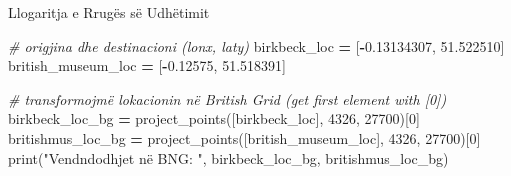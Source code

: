 \documentclass[
  ignorenonframetext,
]{beamer}
\newenvironment{Shaded}{\begin{snugshade}}{\end{snugshade}}
\newcommand{\BuiltInTok}[1]{#1}
\newcommand{\CommentTok}[1]{\textcolor[rgb]{0.56,0.35,0.01}{\textit{#1}}}
\newcommand{\DecValTok}[1]{\textcolor[rgb]{0.00,0.00,0.81}{#1}}
\newcommand{\FloatTok}[1]{\textcolor[rgb]{0.00,0.00,0.81}{#1}}
\newcommand{\NormalTok}[1]{#1}
\newcommand{\OperatorTok}[1]{\textcolor[rgb]{0.81,0.36,0.00}{\textbf{#1}}}
\newcommand{\StringTok}[1]{\textcolor[rgb]{0.31,0.60,0.02}{#1}}
\begin{document}
\begin{frame}[fragile]{Llogaritja e Rrugës së Udhëtimit}
\protect\hypertarget{llogaritja-e-rruguxebs-suxeb-udhuxebtimit}{}

\begin{Shaded}
\begin{Highlighting}[]
\CommentTok{\# origjina dhe destinacioni (lonx, laty)}
\NormalTok{birkbeck\_loc }\OperatorTok{=}\NormalTok{ [}\OperatorTok{{-}}\FloatTok{0.13134307}\NormalTok{, }\FloatTok{51.522510}\NormalTok{]}
\NormalTok{british\_museum\_loc }\OperatorTok{=}\NormalTok{ [}\OperatorTok{{-}}\FloatTok{0.12575}\NormalTok{, }\FloatTok{51.518391}\NormalTok{]}

\CommentTok{\# transformojmë lokacionin në British Grid (get first element with [0])}
\NormalTok{birkbeck\_loc\_bg }\OperatorTok{=}\NormalTok{ project\_points([birkbeck\_loc], }\DecValTok{4326}\NormalTok{, }\DecValTok{27700}\NormalTok{)[}\DecValTok{0}\NormalTok{]}
\NormalTok{britishmus\_loc\_bg }\OperatorTok{=}\NormalTok{ project\_points([british\_museum\_loc], }\DecValTok{4326}\NormalTok{, }\DecValTok{27700}\NormalTok{)[}\DecValTok{0}\NormalTok{]}
\BuiltInTok{print}\NormalTok{(}\StringTok{"Vendndodhjet në BNG: "}\NormalTok{, birkbeck\_loc\_bg, britishmus\_loc\_bg)}
\end{Highlighting}
\end{Shaded}
\end{frame}
\end{document}
